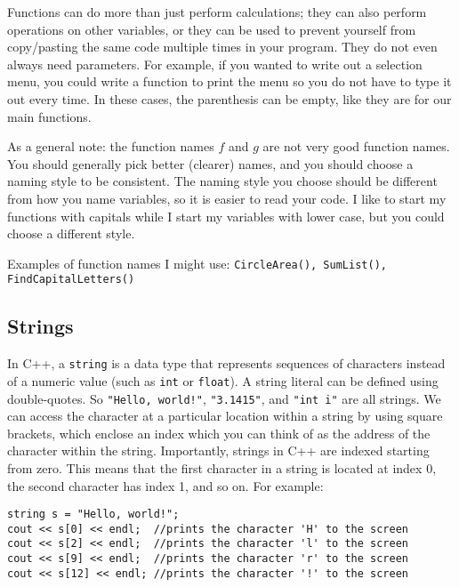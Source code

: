 Functions can do more than just perform calculations; they can also perform operations on other variables, or they can be used to prevent yourself from copy/pasting the same code multiple times in your program. They do not even always need parameters. For example, if you wanted to write out a selection menu, you could write a function to print the menu so you do not have to type it out every time. In these cases, the parenthesis can be empty, like they are for our main functions. 

As a general note: the function names $f$ and $g$ are not very good function names. You should generally pick better (clearer) names, and you should choose a naming style to be consistent. The naming style you choose should be different from how you name variables, so it is easier to read your code. I like to start my functions with capitals while I start my variables with lower case, but you could choose a different style. 

Examples of function names I might use: \texttt{CircleArea(), SumList(), FindCapitalLetters()}

\subsection{Strings}

In C++, a \texttt{string} is a data type that represents sequences of characters instead of a numeric value (such as \texttt{int} or \texttt{float}). A string literal can be defined using double-quotes. So \texttt{"Hello, world!"}, \texttt{"3.1415"}, and \texttt{"int i"} are all strings. We can access the character at a particular location within a string by using square brackets, which enclose an index which you can think of as the address of the character within the string. Importantly, strings in C++ are indexed starting from zero. This means that the first character in a string is located at index 0, the second character has index 1, and so on. For example:

\begin{verbatim}
string s = "Hello, world!";
cout << s[0] << endl;  //prints the character 'H' to the screen
cout << s[2] << endl;  //prints the character 'l' to the screen
cout << s[9] << endl;  //prints the character 'r' to the screen
cout << s[12] << endl; //prints the character '!' to the screen
    
\end{verbatim}

